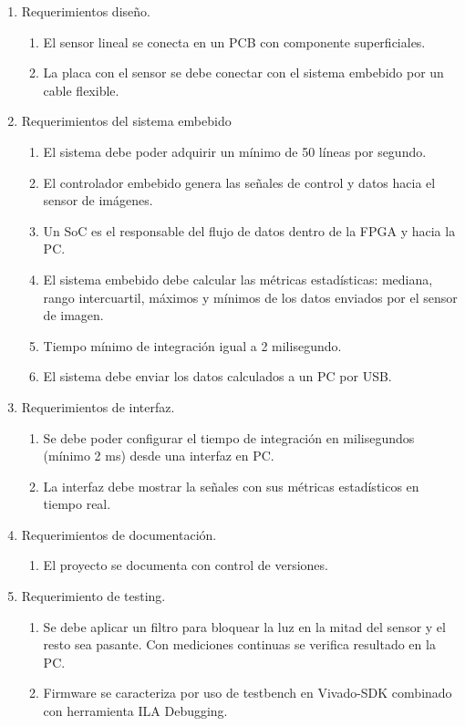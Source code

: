 \documentclass[
11pt, %
codirector, %
]{charter}
\begin{document}
\begin{enumerate}
	\item Requerimientos diseño.
		\begin{enumerate}
			\item El sensor lineal se conecta en un PCB con componente superficiales.
			\item La placa con el sensor se debe conectar con el sistema embebido por un cable flexible.
		\end{enumerate}
		
	\item Requerimientos del sistema embebido
		\begin{enumerate}
			\item El sistema debe poder adquirir un mínimo de 50 líneas por segundo.
			\item El controlador embebido genera las señales de control y datos hacia el sensor de imágenes.
			\item Un SoC es el responsable del flujo de datos dentro de la FPGA y hacia la PC.
			\item El sistema embebido debe calcular las métricas estadísticas: mediana, rango intercuartil, máximos y mínimos de los datos enviados por el sensor de imagen.
			\item Tiempo mínimo de integración igual a 2 milisegundo.
			\item El sistema debe enviar los datos calculados a un PC por USB.
		\end{enumerate}
	\item Requerimientos de interfaz.
		\begin{enumerate}
			\item Se debe poder configurar el tiempo de integración en milisegundos (mínimo 2 ms) desde una interfaz en PC.
			\item La interfaz debe mostrar la señales con sus métricas estadísticos en tiempo real.
		\end{enumerate}
	\item Requerimientos de documentación.
		\begin{enumerate}
			\item El proyecto se documenta con control de versiones.
		\end{enumerate}
	\item Requerimiento de testing.
	\begin{enumerate}
			\item Se debe aplicar un filtro para bloquear la luz en la mitad del sensor y el resto sea pasante. Con mediciones continuas se verifica resultado en la PC.
			\item Firmware se caracteriza por uso de testbench en Vivado-SDK combinado con herramienta ILA Debugging.
		\end{enumerate}
	
\end{enumerate}
\end{document}

